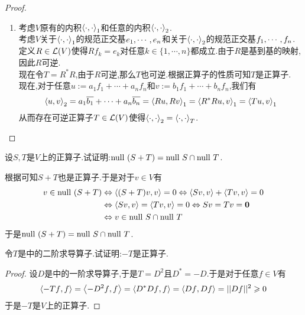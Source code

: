 \documentclass{ctexart}
\begin{document}
\begin{proof}
\begin{enumerate}[label=\tbf{(\arabic*)}]
        \item 考虑$V$原有的内积$\left\langle{\cdot},{\cdot}\right\rangle_1$和任意的内积$\left\langle{\cdot},{\cdot}\right\rangle_2$.\\
            考虑$V$关于$\left\langle{\cdot},{\cdot}\right\rangle_1$的规范正交基${e}_1,\cdots,{e}_{n}$和关于$\left\langle{\cdot},{\cdot}\right\rangle_2$的规范正交基${f}_1,\cdots,{f}_{n}$.\\
            定义$R\in\mathcal{L}(V)$使得$Rf_k=e_k$对任意$k\in\{1,\cdots,n\}$都成立.由于$R$是基到基的映射,因此$R$可逆.\\
            现在令$T=R^*R$,由于$R$可逆,那么$T$也可逆.根据正算子的性质可知$T$是正算子.\\
            现在,对于任意$u:=a_1f_1+\cdots+a_nf_n$和$v:=b_1f_1+\cdots+b_nf_n$,我们有
            \[\left\langle{u},{v}\right\rangle_2=a_1\overline{b_1}+\cdots+a_n\overline{b_n}=\left\langle{Ru},{Rv}\right\rangle_1=\left\langle{R^*Ru},{v}\right\rangle_1=\left\langle{Tu},{v}\right\rangle_1\]
            从而存在可逆正算子$T\in\mathcal{L}(V)$使得$\left\langle{\cdot},{\cdot}\right\rangle_2=\left\langle{\cdot},{\cdot}\right\rangle_T$.
    \end{enumerate}
\end{proof}
\begin{problem}[24.]
    设$S,T$是$V$上的正算子.试证明:$\text{null }(S+T)=\text{null } S\cap\text{null } T$.
\end{problem}
\begin{problem}
    根据可知$S+T$也是正算子.于是对于$v\in V$有
    \[\begin{aligned}
        v\in\text{null }(S+T)
        &\Leftrightarrow\left\langle{(S+T)v},{v}\right\rangle=0
        \Leftrightarrow\left\langle{Sv},{v}\right\rangle+\left\langle{Tv},{v}\right\rangle=0 \\
        &\Leftrightarrow\left\langle{Sv},{v}\right\rangle=\left\langle{Tv},{v}\right\rangle=0
        \Leftrightarrow Sv=Tv=\mathbf0 \\
        &\Leftrightarrow v\in\text{null } S\cap\text{null } T
    \end{aligned}\]
    于是$\text{null }(S+T)=\text{null } S\cap\text{null } T$.
\end{problem}
\begin{problem}[25.]
    令$T$是中的二阶求导算子.试证明:$-T$是正算子.
\end{problem}
\begin{proof}
    设$D$是中的一阶求导算子,于是$T=D^2$且$D^*=-D$.于是对于任意$f\in V$有
    \[\left\langle{-Tf},{f}\right\rangle=\left\langle{-D^2f},{f}\right\rangle=\left\langle{D^*Df},{f}\right\rangle=\left\langle{Df},{Df}\right\rangle=||Df||^2\geqslant0\]
    于是$-T$是$V$上的正算子.
\end{proof}
\end{document}
